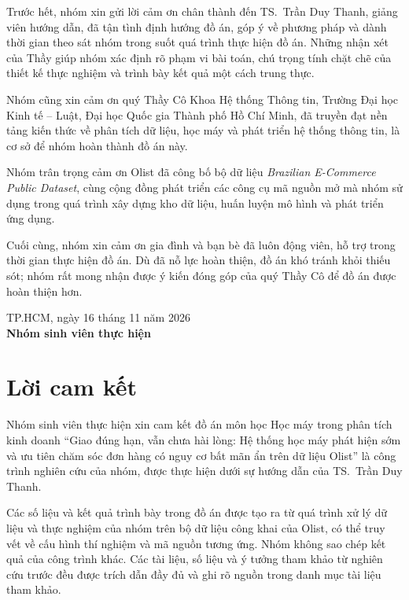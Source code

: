 \documentclass[12pt,a4paper]{report}
\begin{document}
Trước hết, nhóm xin gửi lời cảm ơn chân thành đến TS.~Trần Duy Thanh, giảng viên hướng dẫn, đã tận tình định hướng đồ án, góp ý về phương pháp và dành thời gian theo sát nhóm trong suốt quá trình thực hiện đồ án. Những nhận xét của Thầy giúp nhóm xác định rõ phạm vi bài toán, chú trọng tính chặt chẽ của thiết kế thực nghiệm và trình bày kết quả một cách trung thực.

Nhóm cũng xin cảm ơn quý Thầy Cô Khoa Hệ thống Thông tin, Trường Đại học Kinh tế -- Luật, Đại học Quốc gia Thành phố Hồ Chí Minh, đã truyền đạt nền tảng kiến thức về phân tích dữ liệu, học máy và phát triển hệ thống thông tin, là cơ sở để nhóm hoàn thành đồ án này.

Nhóm trân trọng cảm ơn Olist đã công bố bộ dữ liệu \emph{Brazilian E-Commerce Public Dataset}, cùng cộng đồng phát triển các công cụ mã nguồn mở mà nhóm sử dụng trong quá trình xây dựng kho dữ liệu, huấn luyện mô hình và phát triển ứng dụng.

Cuối cùng, nhóm xin cảm ơn gia đình và bạn bè đã luôn động viên, hỗ trợ trong thời gian thực hiện đồ án. Dù đã nỗ lực hoàn thiện, đồ án khó tránh khỏi thiếu sót; nhóm rất mong nhận được ý kiến đóng góp của quý Thầy Cô để đồ án được hoàn thiện hơn.

\vspace{1cm}
\begin{flushright}
\begin{minipage}{0.5\linewidth}\centering
TP.HCM, ngày 16 tháng 11 năm 2026\\
\textbf{Nhóm sinh viên thực hiện}
\end{minipage}
\end{flushright}

\chapter*{Lời cam kết}

Nhóm sinh viên thực hiện xin cam kết đồ án môn học Học máy trong phân tích kinh doanh ``Giao đúng hạn, vẫn chưa hài lòng: Hệ thống học máy phát hiện sớm và ưu tiên chăm sóc đơn hàng có nguy cơ bất mãn ẩn trên dữ liệu Olist'' là công trình nghiên cứu của nhóm, được thực hiện dưới sự hướng dẫn của TS.~Trần Duy Thanh.

Các số liệu và kết quả trình bày trong đồ án được tạo ra từ quá trình xử lý dữ liệu và thực nghiệm của nhóm trên bộ dữ liệu công khai của Olist, có thể truy vết về cấu hình thí nghiệm và mã nguồn tương ứng. Nhóm không sao chép kết quả của công trình khác. Các tài liệu, số liệu và ý tưởng tham khảo từ nghiên cứu trước đều được trích dẫn đầy đủ và ghi rõ nguồn trong danh mục tài liệu tham khảo.
\end{document}

